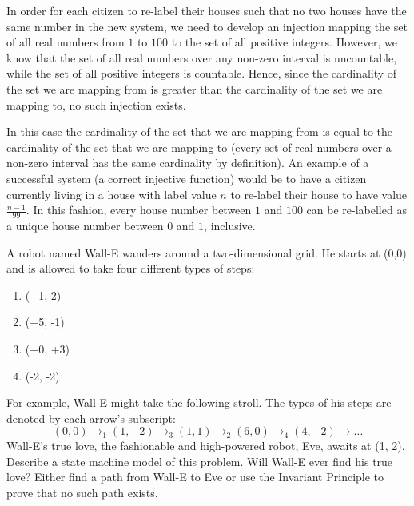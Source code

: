 \documentclass[solution, letterpaper]{cs20}
\begin{document}
\begin{solution}
\subsolution In order for each citizen to re-label their houses such that no two houses have the same number in the new system, we need to develop an injection mapping the set of all real numbers from $1$ to $100$ to the set of all positive integers. However, we know that the set of all real numbers over any non-zero interval is uncountable, while the set of all positive integers is countable. Hence, since the cardinality of the set we are mapping from is greater than the cardinality of the set we are mapping to, no such injection exists.

\subsolution In this case the cardinality of the set that we are mapping from is equal to the cardinality of the set that we are mapping to (every set of real numbers over a non-zero interval has the same cardinality by definition). An example of a successful system (a correct injective function) would be to have a citizen currently living in a house with label value $n$ to re-label their house to have value $\frac{n-1}{99}$. In this fashion, every house number between $1$ and $100$ can be re-labelled as a unique house number between $0$ and $1$, inclusive.
\end{solution}

A robot named Wall-E wanders around a two-dimensional grid. He starts at (0,0) and is allowed to take four different types of steps:
\begin{enumerate}
\item (+1,-2)
\item (+5, -1)
\item (+0, +3)
\item (-2, -2)
\end{enumerate}
For example, Wall-E might take the following stroll. The types of his steps are denoted by each arrow's subscript:
$$(0,0) \to_1 (1,-2) \to_3 (1,1) \to_2 (6,0) \to_4 (4,-2) \to \ldots$$
Wall-E's true love, the fashionable and high-powered robot, Eve, awaits at (1, 2).
\subproblem Describe a state machine model of this problem.
\subproblem Will Wall-E ever find his true love? Either find a path from Wall-E to Eve or use the Invariant Principle to prove that no such path exists.
\end{document}
